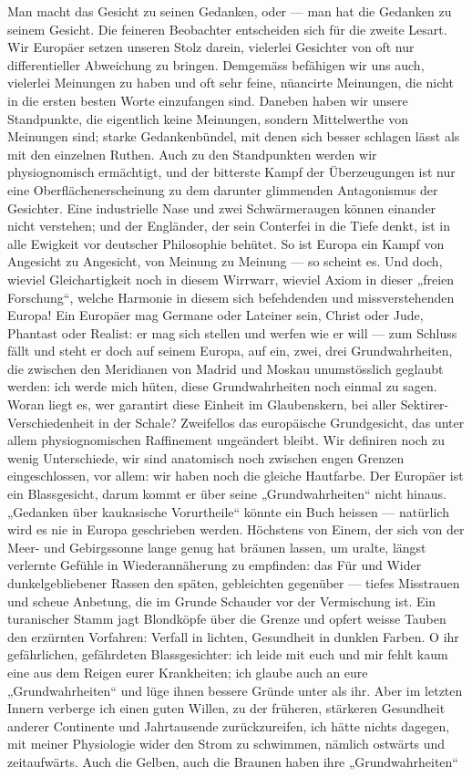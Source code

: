  Man macht das Gesicht zu seinen Gedanken, oder — man hat die Gedanken zu seinem Gesicht. Die feineren Beobachter entscheiden sich für die zweite Lesart. Wir Europäer setzen unseren Stolz darein, vielerlei Gesichter von oft nur differentieller Abweichung zu bringen. Demgemäss befähigen wir uns auch, vielerlei Meinungen zu haben und oft sehr feine, nüancirte Meinungen, die nicht in die ersten besten Worte einzufangen sind. Daneben haben wir unsere Standpunkte, die eigentlich keine Meinungen, sondern Mittelwerthe von Meinungen sind; starke Gedankenbündel, mit denen sich besser schlagen lässt als mit den einzelnen Ruthen. Auch zu den Standpunkten werden wir physiognomisch ermächtigt, und der bitterste Kampf der Überzeugungen ist nur eine Oberflächenerscheinung zu dem darunter glimmenden Antagonismus der Gesichter. Eine industrielle Nase und zwei Schwärmeraugen können einander nicht verstehen; und der Engländer, der sein Conterfei in die Tiefe denkt, ist in alle Ewigkeit vor deutscher Philosophie behütet. So ist Europa ein Kampf von Angesicht zu Angesicht, von Meinung zu Meinung — so scheint es. Und doch, wieviel Gleichartigkeit noch in diesem Wirrwarr, wieviel Axiom in dieser „freien Forschung“, welche Harmonie in diesem sich befehdenden und missverstehenden Europa! Ein Europäer mag Germane oder Lateiner sein, Christ oder Jude, Phantast oder Realist: er mag sich stellen und werfen wie er will — zum Schluss fällt und steht er doch auf seinem Europa, auf ein, zwei, drei Grundwahrheiten, die zwischen den Meridianen von Madrid und Moskau unumstösslich geglaubt werden: ich werde mich hüten, diese Grundwahrheiten noch einmal zu sagen. Woran liegt es, wer garantirt diese Einheit im Glaubenskern, bei aller Sektirer-Verschiedenheit in der Schale? Zweifellos das europäische Grundgesicht, das unter allem physiognomischen Raffinement ungeändert bleibt. Wir definiren noch zu wenig  Unterschiede, wir sind anatomisch noch zwischen engen Grenzen eingeschlossen, vor allem: wir haben noch die gleiche Hautfarbe. Der Europäer ist ein Blassgesicht, darum kommt er über seine „Grundwahrheiten“ nicht hinaus. „Gedanken über kaukasische Vorurtheile“ könnte ein Buch heissen — natürlich wird es nie in Europa geschrieben werden. Höchstens von Einem, der sich von der Meer- und Gebirgssonne lange genug hat bräunen lassen, um uralte, längst verlernte Gefühle in Wiederannäherung zu empfinden: das Für und Wider dunkelgebliebener Rassen den späten, gebleichten gegenüber — tiefes Misstrauen und scheue Anbetung, die im Grunde Schauder vor der Vermischung ist. Ein turanischer Stamm jagt Blondköpfe über die Grenze und opfert weisse Tauben den erzürnten Vorfahren: Verfall in lichten, Gesundheit in dunklen Farben. O ihr gefährlichen, gefährdeten Blassgesichter: ich leide mit euch und mir fehlt kaum eine aus dem Reigen eurer Krankheiten; ich glaube auch an eure „Grundwahrheiten“ und lüge ihnen bessere Gründe unter als ihr. Aber im letzten Innern verberge ich einen guten Willen, zu der früheren, stärkeren Gesundheit anderer Continente und Jahrtausende zurückzureifen, ich hätte nichts dagegen, mit meiner Physiologie wider den Strom zu schwimmen, nämlich ostwärts und zeitaufwärts. Auch die Gelben, auch die Braunen haben ihre „Grundwahrheiten“ 
\par

